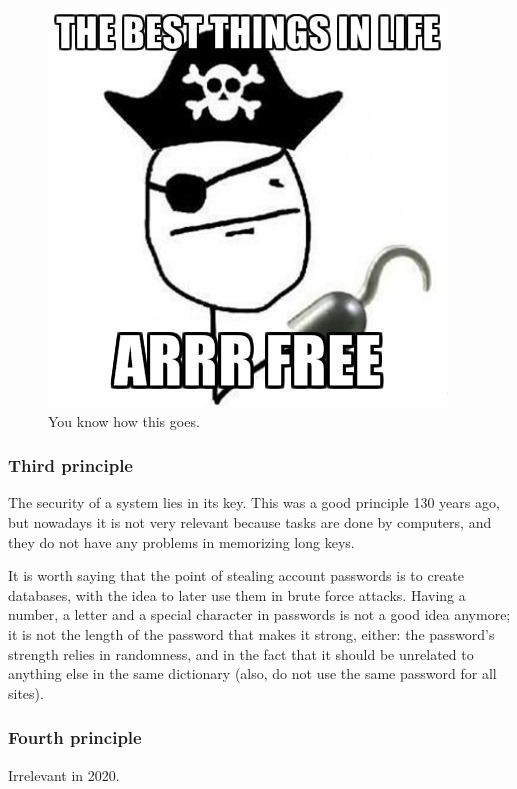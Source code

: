 \begin{figure}[h]
    \centering
    \includegraphics[scale=0.5]{img/pirate_free_things.png}
    \decoRule
    \caption{You know how this goes.}
    \label{fig:pirate_free_things}
\end{figure}


\subsubsection*{Third principle}
The security of a system lies in its key. This was a good principle 130 years ago, but nowadays it is not very relevant because tasks are done by computers, and they do not have any problems in memorizing long keys.

It is worth saying that the point of stealing account passwords is to create databases, with the idea to later use them in brute force attacks. Having a number, a letter and a special character in passwords is not a good idea anymore; it is not the length of the password that makes it strong, either: the password's strength relies in randomness, and in the fact that it should be unrelated to anything else in the same dictionary (also, do not use the same password for all sites).


\subsubsection*{Fourth principle}
Irrelevant in 2020.

